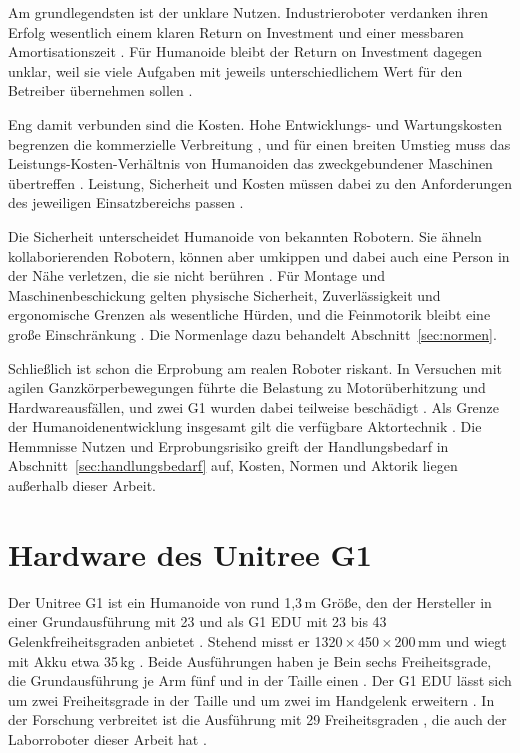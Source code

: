 Am grundlegendsten ist der unklare Nutzen.
Industrieroboter verdanken ihren Erfolg wesentlich einem klaren Return on Investment und einer messbaren Amortisationszeit \cite{Prather2025}.
Für Humanoide bleibt der Return on Investment dagegen unklar, weil sie viele Aufgaben mit jeweils unterschiedlichem Wert für den Betreiber übernehmen sollen \cite{Prather2025}.

Eng damit verbunden sind die Kosten.
Hohe Entwicklungs- und Wartungskosten begrenzen die kommerzielle Verbreitung \cite{Tong2024}, und für einen breiten Umstieg muss das Leistungs-Kosten-Verhältnis von Humanoiden das zweckgebundener Maschinen übertreffen \cite{Prather2025}.
Leistung, Sicherheit und Kosten müssen dabei zu den Anforderungen des jeweiligen Einsatzbereichs passen \cite{Tong2024}.

Die Sicherheit unterscheidet Humanoide von bekannten Robotern.
Sie ähneln kollaborierenden Robotern, können aber umkippen und dabei auch eine Person in der Nähe verletzen, die sie nicht berühren \cite{Prather2025}.
Für Montage und Maschinenbeschickung gelten physische Sicherheit, Zuverlässigkeit und ergonomische Grenzen als wesentliche Hürden, und die Feinmotorik bleibt eine große Einschränkung \cite{Prather2025}.
Die Normenlage dazu behandelt Abschnitt~\ref{sec:normen}.

Schließlich ist schon die Erprobung am realen Roboter riskant.
In Versuchen mit agilen Ganzkörperbewegungen führte die Belastung zu Motorüberhitzung und Hardwareausfällen, und zwei G1 wurden dabei teilweise beschädigt \cite{He2025}.
Als Grenze der Humanoidenentwicklung insgesamt gilt die verfügbare Aktortechnik \cite{Saeedvand2019}.
Die Hemmnisse Nutzen und Erprobungsrisiko greift der Handlungsbedarf in Abschnitt~\ref{sec:handlungsbedarf} auf, Kosten, Normen und Aktorik liegen außerhalb dieser Arbeit.

\section{Hardware des Unitree G1}
\label{sec:g1_hardware}
Der Unitree G1 ist ein Humanoide von rund 1,3\,m Größe, den der Hersteller in einer Grundausführung mit 23 und als G1 EDU mit 23 bis 43 Gelenkfreiheitsgraden anbietet .
Stehend misst er 1320\,×\,450\,×\,200\,mm und wiegt mit Akku etwa 35\,kg .
Beide Ausführungen haben je Bein sechs Freiheitsgrade, die Grundausführung je Arm fünf und in der Taille einen .
Der G1 EDU lässt sich um zwei Freiheitsgrade in der Taille und um zwei im Handgelenk erweitern .
In der Forschung verbreitet ist die Ausführung mit 29 Freiheitsgraden \cite{Ze2025} \cite{Luo2026}, die auch der Laborroboter dieser Arbeit hat .

